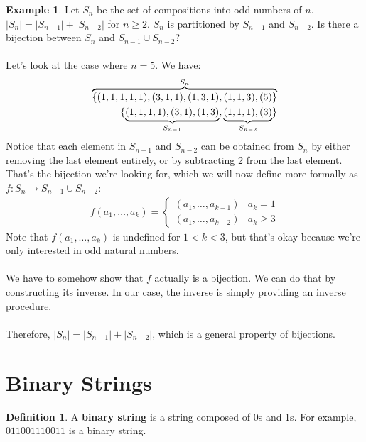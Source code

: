 \documentclass[]{article}
\theoremstyle{definition}
\newtheorem*{defn}{Definition}
\newtheorem{ex}{Example}[section]
\newcommand{\lecture}[1]{\marginpar{{\footnotesize $\leftarrow$ \underline{#1}}}}
\DeclarePairedDelimiter{\set}{\lbrace}{\rbrace}
\begin{document}
				\begin{ex}
					Let $S_n$ be the set of compositions into odd numbers of $n$. $|S_n| = |S_{n - 1}| + |S_{n - 2}|$ for $n \ge 2$. $S_n$ is partitioned by $S_{n - 1}$ and $S_{n - 2}$. Is there a bijection between $S_n$ and $S_{n - 1} \cup S_{n - 2}$?
					\\ \\
					Let's look at the case where $n = 5$. We have: \lecture{January 25, 2013}
					\begin{align*}
						\overbrace{\set{(1, 1, 1, 1, 1), (3, 1, 1), (1, 3, 1), (1, 1, 3), (5) }}^{S_n} \\
						\set{\underbrace{(1, 1, 1, 1), (3, 1), (1, 3)}_{S_{n - 1}}, \underbrace{(1, 1, 1), (3)}_{S_{n - 2}} } 
					\end{align*}
					Notice that each element in $S_{n - 1}$ and $S_{n - 2}$ can be obtained from $S_n$ by either removing the last element entirely, or by subtracting 2 from the last element. That's the bijection we're looking for, which we will now define more formally as $f : S_n \to S_{n - 1} \cup S_{n - 2}$:
					\begin{align*}
						f(a_1, \ldots, a_k) = \begin{cases}
							(a_1, \ldots, a_{k - 1}) & a_k = 1 \\
							(a_1, \ldots, a_{k - 2}) & a_k \ge 3
						\end{cases}
					\end{align*}
					Note that $f(a_1, \ldots, a_k)$ is undefined for $1 < k < 3$, but that's okay because we're only interested in odd natural numbers. 
					\\ \\
					We have to somehow show that $f$ actually is a bijection. We can do that by constructing its inverse. In our case, the inverse is simply providing an inverse procedure.
					\\ \\
					Therefore, $|S_n| = |S_{n - 1}| + |S_{n - 2}|$, which is a general property of bijections.
				\end{ex}
	
	\section{Binary Strings}
		\begin{defn}
		A \textbf{binary string} is a string composed of 0s and 1s. For example, $011001110011$ is a binary string.
		\end{defn}
\end{document}
